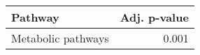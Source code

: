 \begin{tabular}{lr}
\toprule
            Pathway &  Adj. p-value \\
\midrule
 Metabolic pathways &         0.001 \\
\bottomrule
\end{tabular}
